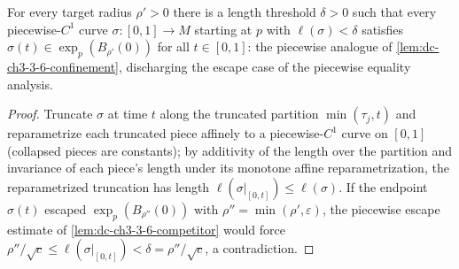\begin{lemma}
  \label{lem:dc-ch3-3-6-confinement-piecewise}
  \leanok
  For every target radius $\rho'>0$ there is a length threshold $\delta>0$
  such that every piecewise-$C^1$ curve $\sigma:[0,1]\to M$ starting at $p$
  with $\ell(\sigma)<\delta$ satisfies $\sigma(t)\in\exp_p(B_{\rho'}(0))$
  for all $t\in[0,1]$: the piecewise analogue of
  \cref{lem:dc-ch3-3-6-confinement}, discharging the escape case of the
  piecewise equality analysis.
\end{lemma}
\begin{proof}
  \sketch
  \leanok
  Truncate $\sigma$ at time $t$ along the truncated partition
  $\min(\tau_j,t)$ and reparametrize each truncated piece affinely to a
  piecewise-$C^1$ curve on $[0,1]$ (collapsed pieces are constants); by
  additivity of the length over the partition and invariance of each
  piece's length under its monotone affine reparametrization, the
  reparametrized truncation has length
  $\ell(\sigma|_{[0,t]})\le\ell(\sigma)$. If the endpoint $\sigma(t)$
  escaped $\exp_p(B_{\rho''}(0))$ with $\rho''=\min(\rho',\varepsilon)$, the
  piecewise escape estimate of \cref{lem:dc-ch3-3-6-competitor} would force
  $\rho''/\sqrt{c}\le\ell(\sigma|_{[0,t]})<\delta=\rho''/\sqrt{c}$, a
  contradiction.
\end{proof}

